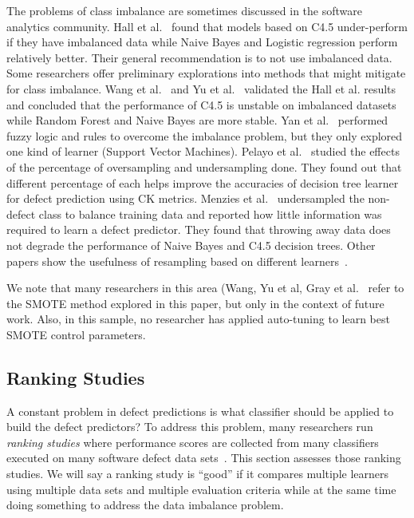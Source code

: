 \documentclass[10pt,conference]{IEEEtran}
\theoremstyle{break}
\theoremstyle{break}
\newcommand{\sma}{{\sc SMOTE}}
\begin{document}
The problems of class imbalance are sometimes discussed in the software analytics community.
Hall et al.~\cite{hall2012systematic} found that models based on C4.5 under-perform if they have imbalanced data while Naive Bayes and Logistic regression perform relatively better. 
Their general recommendation is to not use
imbalanced data.  
Some researchers offer preliminary explorations into methods that might mitigate for class imbalance.
Wang et al.~\cite{wang2013using} and Yu et al.~\cite{yuperformance} validated the Hall et al. results and concluded that the
performance of C4.5 is unstable on imbalanced datasets while  Random Forest and Naive Bayes are 
more stable. 
Yan et al.~\cite{yan2010software} performed fuzzy logic and rules to overcome the imbalance problem, but they only
explored one kind of learner (Support Vector Machines).
Pelayo et al.~\cite{pelayo2007applying} studied the effects of the percentage of oversampling and undersampling done. They found out that different percentage of each helps improve the accuracies of decision tree learner for defect prediction using CK metrics. Menzies et al.~\cite{menzies2008implications} undersampled the non-defect class to balance training
data and reported how little information was required to learn a defect predictor. They found that throwing away data does not degrade the performance of Naive Bayes and C4.5 decision trees. Other papers show the usefulness of resampling based on different learners~\cite{pelayo2007applying, pelayo2012evaluating, riquelme2008finding}.

We note that  
many researchers in this area  (Wang, Yu et al, Gray et al.~\cite{gray2009using,yuperformance,wang2013using} refer to the {\sma} method explored in this paper,  but only in the context of future work. 
Also, 
in this sample, no researcher has  applied auto-tuning to learn best {\sma} control parameters. 
 

\subsection{Ranking Studies}
\label{sect:rank}

A constant problem in defect predictions is what  classifier should be applied to  build  the  defect  predictors?
To address this problem, many researchers run {\em ranking studies} where  performance scores 
are collected from  many classifiers  executed on  many software defect data sets~\cite{lessmann2008benchmarking,hall2012systematic,elish2008predicting,menzies2010defect,gondra2008applying,radjenovic2013software,jiang2008techniques,wang2013using,mende2009revisiting,li2012sample,khoshgoftaar2010attribute,jiang2009variance,ghotra2015revisiting,jiang2008can,tantithamthavorn2016automated,fu2016tuning}.
This section assesses those ranking studies. We will say a ranking study is ``good'' if it compares multiple learners using multiple data sets and multiple evaluation criteria
while at the same time doing something to address the data imbalance problem.
\end{document}
